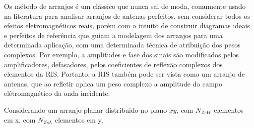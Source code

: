 \documentclass[
	12pt,				%
	openright,			%
	oneside,			%
	a4paper,			%
	english,			%
	brazil				%
	]{abntex2}
\begin{document}
Os método de arranjos é um clássico que nunca sai de moda, comumente usado na literatura para analisar arranjos de antenas perfeitos, sem considerar todos os efeitos eletromagnéticos reais, porém com o intuito de construir diagramas ideais e perfeitos de referência que guiam a modelagem dos arranjos para uma determinada aplicação, com uma determinada técnica de atribuição dos pesos complexos. Por exemplo, a amplitudes e fase dos sinais são modificados pelos amplificadores, defasadores, pelos coeficientes de reflexão complexos dos elementos da RIS. Portanto, a RIS também pode ser vista como um arranjo de antenas, que ao refletir aplica um peso complexo a amplitude do campo elétromagnético da onda incidente.

Considerando um arranjo planar distribuido no plano $xy$, com $N_{ZsW}$ elementos em x, com $N_{ZsL}$ elementos em y, 
\end{document}
